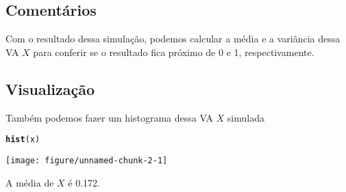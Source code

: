 \documentclass{article}\usepackage[]{graphicx}\usepackage[]{color}
\makeatletter
\def\maxwidth{ %
  \ifdim\Gin@nat@width>\linewidth
    \linewidth
  \else
    \Gin@nat@width
  \fi
}
\newcommand{\hlstd}[1]{\textcolor[rgb]{0.345,0.345,0.345}{#1}}%
\newcommand{\hlkwd}[1]{\textcolor[rgb]{0.737,0.353,0.396}{\textbf{#1}}}%
\newenvironment{kframe}{%
 \def\at@end@of@kframe{}%
 \ifinner\ifhmode%
  \def\at@end@of@kframe{\end{minipage}}%
  \begin{minipage}{\columnwidth}%
 \fi\fi%
 \def\FrameCommand##1{\hskip\@totalleftmargin \hskip-\fboxsep
 \colorbox{shadecolor}{##1}\hskip-\fboxsep
     \hskip-\linewidth \hskip-\@totalleftmargin \hskip\columnwidth}%
 \MakeFramed {\advance\hsize-\width
   \@totalleftmargin\z@ \linewidth\hsize
   \@setminipage}}%
 {\par\unskip\endMakeFramed%
 \at@end@of@kframe}
\newenvironment{knitrout}{}{} %
\makeatother
\begin{document}
\subsection{Comentários}

Com o resultado dessa simulação, podemos calcular a média e a variância
dessa VA $X$ para conferir se o resultado fica próximo de 0 e 1,
respectivamente.

\subsection{Visualização}

Também podemos fazer um histograma dessa VA $X$ simulada

\begin{knitrout}
\color{fgcolor}\begin{kframe}
\begin{alltt}
\hlkwd{hist}\hlstd{(x)}
\end{alltt}
\end{kframe}
\texttt{[image: figure/unnamed-chunk-2-1]} 

\end{knitrout}

A média de $X$ é 0.172.
\end{document}
